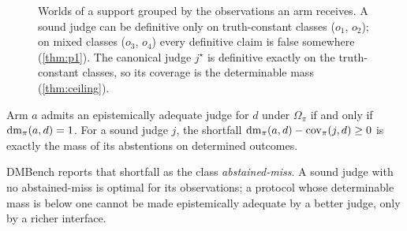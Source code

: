 \begin{figure}[t]
\centering
{}
\caption{Worlds of a support grouped by the observations an arm receives. A sound judge can be definitive only on truth-constant classes ($o_1$, $o_2$); on mixed classes ($o_3$, $o_4$) every definitive claim is false somewhere (\cref{thm:p1}). The canonical judge $j^\star$ is definitive exactly on the truth-constant classes, so its coverage is the determinable mass (\cref{thm:ceiling}).}
\label{fig:ceiling}
\end{figure}

\begin{corollary}
\label{cor:interface}
Arm $a$ admits an epistemically adequate judge for $d$ under $\Omega_\pi$ if and only if $\operatorname{dm}_\pi(a, d) = 1$. For a sound judge $j$, the shortfall $\operatorname{dm}_\pi(a,d) - \operatorname{cov}_\pi(j,d) \geq 0$ is exactly the mass of its abstentions on determined outcomes.
\end{corollary}

DMBench reports that shortfall as the class \emph{abstained-miss}. A sound judge with no abstained-miss is optimal for its observations; a protocol whose determinable mass is below one cannot be made epistemically adequate by a better judge, only by a richer interface.

